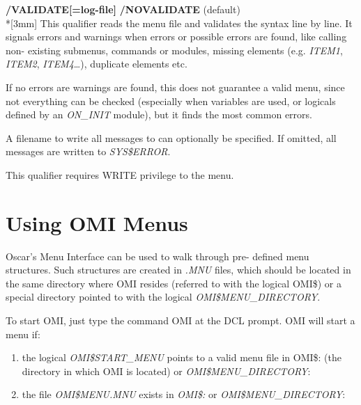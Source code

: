 \documentclass[a4paper]{book}
\newcommand{\vs}{\vspace{3mm}}
\renewcommand{\indent}{\hspace*{5mm}}
\begin{document}
\vs

\indent\textbf{/VALIDATE[=log-file]} \newline
\indent\textbf{/NOVALIDATE} (default)\\*[3mm]
This qualifier reads the menu file and validates the syntax line by line. It 
signals errors and warnings when errors or possible errors are found, like 
calling non- existing submenus, commands or modules, missing elements (e.g. 
\textsl{ITEM1}, \textsl{ITEM2}, \textsl{ITEM4}\ldots), duplicate elements etc.

\vs

If no errors are warnings are found, this does not guarantee a valid menu, 
since not everything can be checked (especially when variables are used, or 
logicals defined by an \textsl{ON{\_}INIT} module), but it finds the most common 
errors.

\vs

A filename to write all messages to can optionally be specified. If omitted, 
all messages are written to \textsl{SYS{\$}ERROR}.

\vs

This qualifier requires WRITE privilege to the menu.

\chapter{Using OMI Menus}
\label{sec:using}

Oscar's Menu Interface can be used to walk through pre- defined menu 
structures. Such structures are created in \textsl{.MNU} files, which should be 
located in the same directory where OMI resides (referred to with the 
logical OMI{\$}) or a special directory pointed to with the logical 
\textsl{OMI{\$}MENU{\_}DIRECTORY}.

To start OMI, just type the command OMI at the DCL prompt. OMI will start a 
menu if:
\begin{enumerate}
\item the logical \textsl{OMI{\$}START{\_}MENU} points to a valid menu file in 
OMI{\$}: (the directory in which OMI is located)
or \textsl{OMI{\$}MENU{\_}DIRECTORY}:

\item the file \textsl{OMI{\$}MENU.MNU} exists in \textsl{OMI{\$}:} or
\textsl{OMI{\$}MENU{\_}DIRECTORY}:
\end{enumerate}
\end{document}
